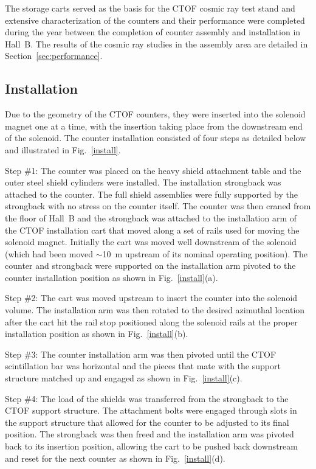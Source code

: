 \documentclass{elsart}
\begin{document}
The storage carts served as the basis for the CTOF cosmic ray test stand and extensive 
characterization of the counters and their performance were completed during the year between 
the completion of counter assembly and installation in Hall~B. The results of the cosmic ray 
studies in the assembly area are detailed in Section~\ref{sec:performance}.

\subsection{Installation}
\label{installation}

Due to the geometry of the CTOF counters, they were inserted into the solenoid magnet one at a 
time, with the insertion taking place from the downstream end of the solenoid. The counter 
installation consisted of four steps as detailed below and illustrated in Fig.~\ref{install}.

Step \#1: The counter was placed on the heavy shield attachment table and the outer steel shield
cylinders were installed. The installation strongback was attached to the counter. The full shield 
assemblies were fully supported by the strongback with no stress on the counter itself. The 
counter was then craned from the floor of Hall~B and the strongback was attached to the installation
arm of the CTOF installation cart that moved along a set of rails used for moving the solenoid magnet.
Initially the cart was moved well downstream of the solenoid (which had been moved $\sim$10~m
upstream of its nominal operating position). The counter and strongback were supported on the
installation arm pivoted to the counter installation position as shown in Fig.~\ref{install}(a).

Step \#2: The cart was moved upstream to insert the counter into the solenoid volume. The
installation arm was then rotated to the desired azimuthal location after the cart hit the rail stop
positioned along the solenoid rails at the proper installation position as shown in Fig.~\ref{install}(b).

Step \#3: The counter installation arm was then pivoted until the CTOF scintillation bar was horizontal
and the pieces that mate with the support structure matched up and engaged as shown in Fig.~\ref{install}(c).

Step \#4: The load of the shields was transferred from the strongback to the CTOF support structure.
The attachment bolts were engaged through slots in the support structure that allowed for the counter to
be adjusted to its final position. The strongback was then freed and the installation arm was pivoted back
to its insertion position, allowing the cart to be pushed back downstream and reset for the next counter as
shown in Fig.~\ref{install}(d).
\end{document}
